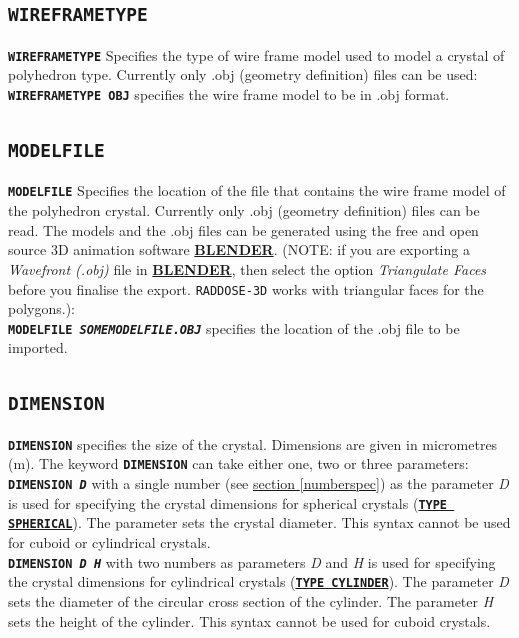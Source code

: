 \documentclass[a4paper]{article}
\newcommand{\RD}{\texttt{RADDOSE-3D}\xspace}
\newcommand{\Keyword}[1]{\texttt{\textbf{#1}}\xspace}
\newcommand{\SB}{\\[0.2em]}
\begin{document}
\subsection{\Keyword{WIREFRAMETYPE}}
\label{wireframetype}
\Keyword{WIREFRAMETYPE} Specifies the type of wire frame model used to model a crystal of polyhedron type.
Currently only .obj (geometry definition) files can be used:\SB

\noindent \Keyword{WIREFRAMETYPE OBJ}
specifies the wire frame model to be in .obj format. \SB

\subsection{\Keyword{MODELFILE}}
\label{modelfile}
\Keyword{MODELFILE} Specifies the location of the file that contains the wire frame model of the polyhedron crystal.
Currently only .obj (geometry definition) files can be read. The models and the .obj files can be generated using the free and open source 3D animation software \href{http://www.blender.org/}{\textbf{BLENDER}}. (NOTE: if you are exporting a \textit{Wavefront (.obj)} file in \href{http://www.blender.org/}{\textbf{BLENDER}}, then select the option \textit{Triangulate Faces} before you finalise the export. \RD works with triangular faces for the polygons.):\SB

\noindent \Keyword{MODELFILE \textit{SOMEMODELFILE.OBJ}}
specifies the location of the .obj file to be imported. \SB


\subsection{\Keyword{DIMENSION}}
\label{crystaldimension}
\Keyword{DIMENSION} specifies the size of the crystal.
Dimensions are given in micrometres (\hbox{\textmu}m).
The keyword \Keyword{DIMENSION} can take either one, two or three parameters:\SB

\noindent \Keyword{DIMENSION \textit{D}} with a single number (see \hyperref[numberspec]{section \ref*{numberspec}}) as the parameter \textit{D} is used for specifying the crystal dimensions for spherical crystals (\hyperref[crystaltype]{\Keyword{TYPE SPHERICAL}}). The parameter sets the crystal diameter. This syntax cannot be used for cuboid or cylindrical crystals.\SB

\noindent \Keyword{DIMENSION \textit{D H}} with two numbers as parameters \textit{D} and \textit{H} is used for specifying the crystal dimensions for cylindrical crystals (\hyperref[crystaltype]{\Keyword{TYPE CYLINDER}}). The parameter \textit{D} sets the diameter of the circular cross section of the cylinder. The parameter \textit{H} sets the height of the cylinder. This syntax cannot be used for cuboid crystals.\SB
\end{document}
